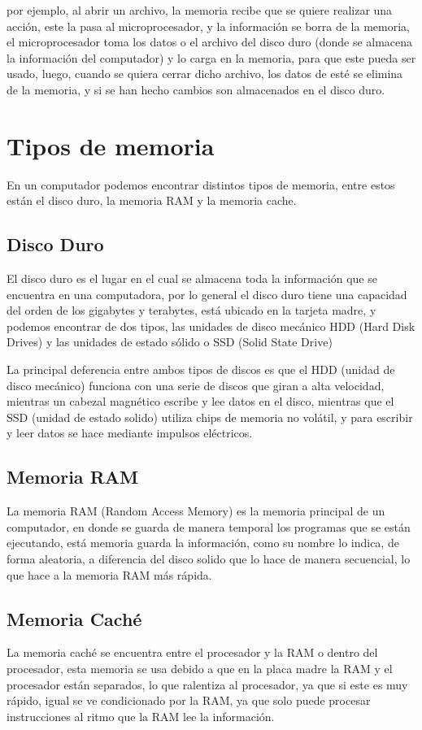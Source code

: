 \documentclass{article}
\begin{document}
por ejemplo, al abrir un archivo, la memoria recibe que se quiere realizar una acción, este la pasa al microprocesador, y la información se borra de la memoria, el microprocesador toma los datos o el archivo del disco duro (donde se almacena la información del computador) y lo carga en la memoria, para que este pueda ser usado, luego, cuando se quiera cerrar dicho archivo, los datos de esté se elimina de la memoria, y si se han hecho cambios son almacenados en el disco duro.\cite{Salazar}


\section{Tipos de memoria} \label{contenido}
En un computador podemos encontrar distintos tipos de memoria, entre estos están el disco duro, la memoria RAM y la memoria cache.

\subsection{Disco Duro}
El disco duro es el lugar en el cual se almacena toda la información que se encuentra en una computadora, por lo general el disco duro tiene una capacidad del orden de los gigabytes y terabytes, está ubicado en la tarjeta madre, y podemos encontrar de dos tipos, las unidades de disco mecánico HDD (Hard Disk Drives) y las unidades de estado sólido o SSD (Solid State Drive)
\vspace{0.5cm}

La principal deferencia entre ambos tipos de discos es que el HDD (unidad de disco mecánico) funciona con una serie de discos que giran a alta velocidad, mientras un cabezal magnético escribe y lee datos en el disco, mientras que el SSD (unidad de estado solido) utiliza chips de memoria no volátil, y para escribir y leer datos se hace mediante impulsos eléctricos.\cite{andres2017cual} 

\subsection{Memoria RAM}
La memoria RAM (Random Access Memory) es la memoria principal de un computador, en donde se guarda de manera temporal los programas que se están ejecutando, está memoria  guarda la información, como su nombre lo indica, de forma aleatoria, a diferencia del disco solido que lo hace de manera secuencial, lo que hace a la memoria RAM más rápida.\cite{rebollo2011memoria}

\subsection{Memoria Caché}
La memoria caché se encuentra entre el procesador y la RAM o dentro del procesador, esta memoria se usa debido a que en la placa madre la RAM y el procesador están separados, lo que ralentiza al procesador, ya que si este es muy rápido, igual se ve condicionado por la RAM, ya que solo puede procesar instrucciones al ritmo que la RAM lee la información.
\vspace{0.5cm}
\end{document}
